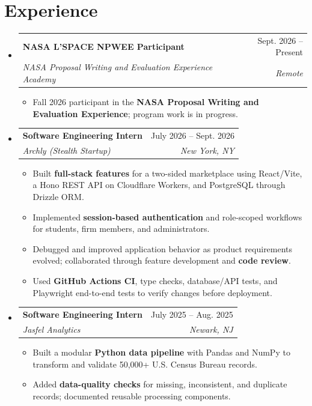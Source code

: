 \documentclass[letterpaper,10pt]{article}
\makeatletter
\newcommand{\resumeItem}[1]{\item\small{#1}}
\newcommand{\resumeSubheading}[4]{
  \vspace{1pt}\item
  \begin{tabular*}{0.97\textwidth}[t]{l@{\extracolsep{\fill}}r}
    \textbf{#1} & #2 \\
    \textit{\small #3} & \textit{\small #4} \\
  \end{tabular*}\vspace{-3pt}
}
\newcommand{\resumeSubHeadingListStart}{\begin{itemize}[leftmargin=0.15in,label={},itemsep=0pt,topsep=0pt]}
\newcommand{\resumeSubHeadingListEnd}{\end{itemize}}
\newcommand{\resumeItemListStart}{\begin{itemize}[leftmargin=0.15in,label=\textbullet,itemsep=-2pt,topsep=0pt]}
\newcommand{\resumeItemListEnd}{\end{itemize}\vspace{0pt}}
\makeatother
\begin{document}
\section{Experience}
\resumeSubHeadingListStart
  \resumeSubheading{NASA L'SPACE NPWEE Participant}{Sept. 2026 -- Present}
    {NASA Proposal Writing and Evaluation Experience Academy}{Remote}
    \resumeItemListStart
      \resumeItem{Fall 2026 participant in the \textbf{NASA Proposal Writing and Evaluation Experience}; program work is in progress.}
    \resumeItemListEnd
  \resumeSubheading{Software Engineering Intern}{July 2026 -- Sept. 2026}
    {Archly (Stealth Startup)}{New York, NY}
    \resumeItemListStart
      \resumeItem{Built \textbf{full-stack features} for a two-sided marketplace using React/Vite, a Hono REST API on Cloudflare Workers, and PostgreSQL through Drizzle ORM.}
      \resumeItem{Implemented \textbf{session-based authentication} and role-scoped workflows for students, firm members, and administrators.}
      \resumeItem{Debugged and improved application behavior as product requirements evolved; collaborated through feature development and \textbf{code review}.}
      \resumeItem{Used \textbf{GitHub Actions CI}, type checks, database/API tests, and Playwright end-to-end tests to verify changes before deployment.}
    \resumeItemListEnd
  \resumeSubheading{Software Engineering Intern}{July 2025 -- Aug. 2025}
    {Jasfel Analytics}{Newark, NJ}
    \resumeItemListStart
      \resumeItem{Built a modular \textbf{Python data pipeline} with Pandas and NumPy to transform and validate 50,000+ U.S. Census Bureau records.}
      \resumeItem{Added \textbf{data-quality checks} for missing, inconsistent, and duplicate records; documented reusable processing components.}
    \resumeItemListEnd
\resumeSubHeadingListEnd
\end{document}
